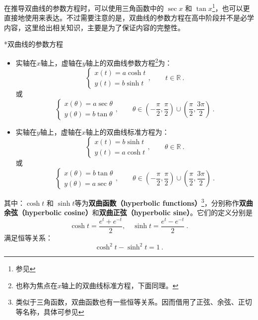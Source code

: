 在推导双曲线的参数方程时，可以使用三角函数中的 $\sec x$ 和 $\tan x$\footnote{参见}，也可以更直接地使用来表达。不过需要注意的是，双曲线的参数方程在高中阶段并不是必学内容，这里给出相关知识，主要是为了保证内容的完整性。

\begin{theorem}{*双曲线的参数方程}
\begin{itemize}
\item 实轴在$x$轴上，虚轴在$y$轴上的双曲线参数方程\footnote{也称为焦点在$x$轴上的双曲线标准方程，下面同理。}为：
\begin{equation}
\begin{cases}
x(t) = a \cosh t\\
y(t) = b \sinh t
\end{cases},\qquad t\in \mathbb{R} ~.
\end{equation}
或
\begin{equation}
\begin{cases}
x(\theta)=a\sec{\theta}\\
y(\theta)=b\tan{\theta}
\end{cases},\qquad \theta \in \left( -\frac{\pi}{2}, \frac{\pi}{2} \right) \cup \left( \frac{\pi}{2}, \frac{3\pi}{2} \right)~.
\end{equation}

\item 实轴在$y$轴上，虚轴在$x$轴上的双曲线标准方程为：
\begin{equation}
\begin{cases}
x(t) = b \sinh t\\
y(t) = a \cosh t
\end{cases},\qquad \theta\in \mathbb{R} ~.
\end{equation}
或
\begin{equation}
\begin{cases}
x(\theta) = b \tan \theta\\
y(\theta) = a \sec \theta
\end{cases},\qquad \theta \in \left( -\frac{\pi}{2}, \frac{\pi}{2} \right) \cup \left( \frac{\pi}{2}, \frac{3\pi}{2} \right)~.
\end{equation}
\end{itemize}
其中：$\cosh t$ 和 $\sinh t$等为\textbf{双曲函数（hyperbolic functions）}\footnote{类似于三角函数，双曲函数也有一些恒等关系。因而借用了正弦、余弦、正切等名称，具体可参见}，分别称作\textbf{双曲余弦（hyperbolic cosine）}和\textbf{双曲正弦（hyperbolic sine）}。它们的定义分别是
\begin{equation}
\cosh t = \frac{e^t + e^{-t}}{2}, \quad \sinh t = \frac{e^t - e^{-t}}{2}~.
\end{equation}
满足恒等关系：
\begin{equation}
\cosh^2 t - \sinh^2 t = 1~.
\end{equation}
\end{theorem}

